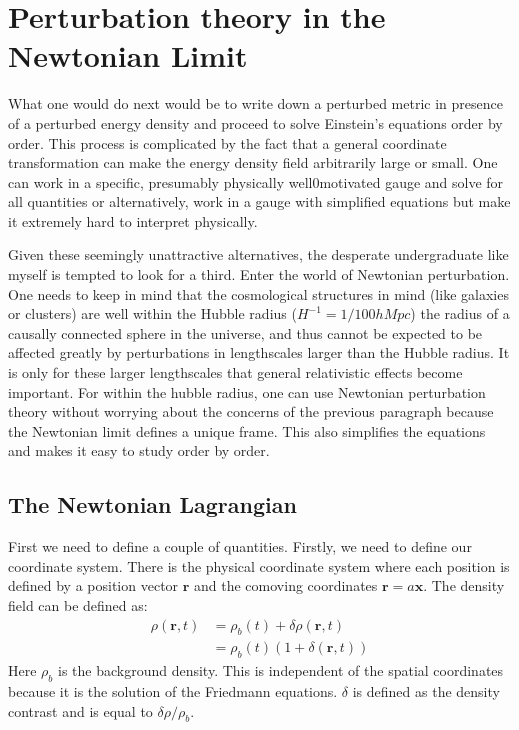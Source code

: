 \documentclass[12pt,a4paper,twoside]{book}
\begin{document}
	\section{Perturbation theory in the Newtonian Limit}
		What one would do next would be to write down a  perturbed metric in presence of a perturbed energy density and proceed to solve Einstein's equations order by order. This process is complicated by the fact that a general coordinate transformation can make the energy density field arbitrarily large or small. One can work in a specific, presumably physically well0motivated gauge and solve for all quantities or alternatively, work in a gauge with simplified equations but make it extremely hard to interpret physically.
		
		Given these seemingly unattractive alternatives, the desperate undergraduate like myself is tempted to look for a third. Enter the world of Newtonian perturbation. One needs to keep in mind that the cosmological structures in mind (like galaxies or clusters) are well within the Hubble radius ($H^{-1} = 1/100h Mpc$) the radius of a causally connected sphere in the universe, and thus cannot be expected to be affected greatly by perturbations in lengthscales larger than the Hubble radius. It is only for these larger lengthscales that general relativistic effects become important. For within the hubble radius, one can use Newtonian perturbation theory without worrying about the concerns of the previous paragraph because the Newtonian limit defines a unique frame. This also simplifies the equations and makes it easy to study order by order.
		
		\subsection{The Newtonian Lagrangian}
			First we need to define a couple of quantities. Firstly, we need to define our coordinate system. There is the physical coordinate system where each position is defined by a position vector $\mathbf{r}$ and the comoving coordinates $\mathbf{r}=a\mathbf{x}$. The density field can be defined as:
			\begin{equation}
				\begin{aligned}
					\rho(\mathbf{r},t)&=\rho_b(t)+\delta\rho(\mathbf{r},t)\\
												 &=\rho_b(t)(1+\delta(\mathbf{r},t))
				\end{aligned}
			\end{equation}
			Here $\rho_b$ is the background density. This is independent of the spatial coordinates because it is the solution of the Friedmann equations. $\delta$ is defined as the density contrast and is equal to $\delta\rho/\rho_b$.
			
\end{document}
